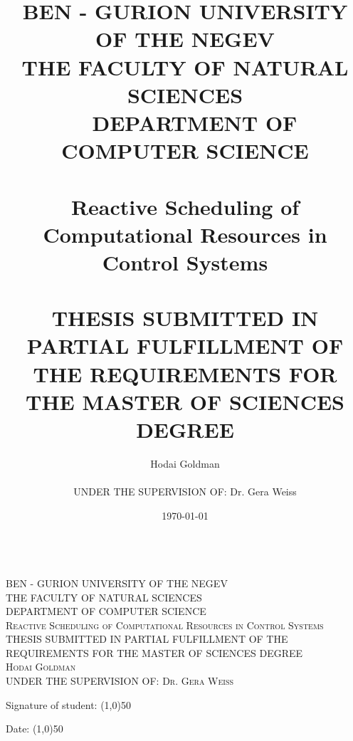\documentclass[ twoside, 12pt ]{article}
\title{\vspace{2cm}\LARGE BEN - GURION UNIVERSITY OF THE NEGEV \\
    \Large THE FACULTY OF NATURAL SCIENCES \\ ~
    \large DEPARTMENT OF COMPUTER SCIENCE \\ ~ \\ \vspace{1cm}Reactive Scheduling of Computational Resources in Control Systems \\ ~ \\ \vspace{1cm}
    \normalsize THESIS SUBMITTED IN PARTIAL FULFILLMENT OF THE REQUIREMENTS FOR 
    THE MASTER OF SCIENCES DEGREE 
}
\author{\Large Hodai Goldman \\ ~ \\ \vspace{1cm}
    UNDER THE SUPERVISION OF: Dr. Gera Weiss }
\date{\printdayoff\today}
\begin{document}
\begin{titlepage}
\maketitle
\end{titlepage}

\begin{titlepage}
    \hspace{3cm}
\end{titlepage}


\begin{titlepage}
    
    \begin{center} 
        \hspace{3cm}\\[2cm]
        \textsc{\large BEN - GURION UNIVERSITY OF THE NEGEV}\\[0.3cm]
        \textsc{\large THE FACULTY OF NATURAL SCIENCES }\\
        \textsc{\large DEPARTMENT OF COMPUTER SCIENCE}\\[1cm]
        
        
        \textsc{\Large Reactive Scheduling of Computational Resources in Control Systems }\\[1.5cm]
        
        
        \textsc{THESIS SUBMITTED IN PARTIAL FULFILLMENT OF THE REQUIREMENTS FOR 
            THE MASTER OF SCIENCES DEGREE }\\[1.5cm]
        
        
        \textsc{\large Hodai Goldman}\\
        \textsc{\large UNDER THE SUPERVISION OF: Dr. Gera Weiss }
        
        
        
        \vspace{4cm}
        
        
        \begin{minipage}{0.8\textwidth}
            \begin{flushleft}
                Signature of student: \line(1,0){50}
            \end{flushleft}
        \end{minipage}
        \begin{minipage}{0.19\textwidth}
            \begin{flushright}
                Date: \line(1,0){50}
            \end{flushright}
        \end{minipage}
        

\end{center}
\end{titlepage}
\end{document}
